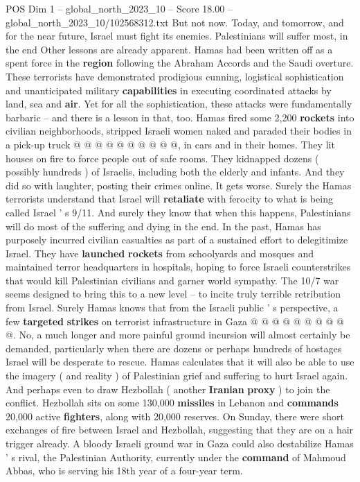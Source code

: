 \begin{textsample}{POS Dim 1 – global\_north\_2023\_10 – Score 18.00 – global\_north\_2023\_10/102568312.txt}
But not now.
Today, and tomorrow, and for the near future, Israel must fight its enemies.
Palestinians will suffer most, in the end Other lessons are already apparent.
Hamas had been written off as a spent force in the \textbf{region} following the Abraham Accords and the Saudi overture.
These terrorists have demonstrated prodigious cunning, logistical sophistication and unanticipated military \textbf{capabilities} in executing coordinated attacks by land, sea and \textbf{air}.
Yet for all the sophistication, these attacks were fundamentally barbaric -- and there is a lesson in that, too.
Hamas fired some 2,200 \textbf{rockets} into civilian neighborhoods, stripped Israeli women naked and paraded their bodies in a pick-up truck @ @ @ @ @ @ @ @ @ @, in cars and in their homes.
They lit houses on fire to force people out of safe rooms.
They kidnapped dozens ( possibly hundreds ) of Israelis, including both the elderly and infants.
And they did so with laughter, posting their crimes online.
It gets worse.
Surely the Hamas terrorists understand that Israel will \textbf{retaliate} with ferocity to what is being called Israel ' s 9/11.
And surely they know that when this happens, Palestinians will do most of the suffering and dying in the end.
In the past, Hamas has purposely incurred civilian casualties as part of a sustained effort to delegitimize Israel.
They have \textbf{launched} \textbf{rockets} from schoolyards and mosques and maintained terror headquarters in hospitals, hoping to force Israeli counterstrikes that would kill Palestinian civilians and garner world sympathy.
The 10/7 war seems designed to bring this to a new level -- to incite truly terrible retribution from Israel.
Surely Hamas knows that from the Israeli public ' s perspective, a few \textbf{targeted} \textbf{strikes} on terrorist infrastructure in Gaza @ @ @ @ @ @ @ @ @ @.
No, a much longer and more painful ground incursion will almost certainly be demanded, particularly when there are dozens or perhaps hundreds of hostages Israel will be desperate to rescue.
Hamas calculates that it will also be able to use the imagery ( and reality ) of Palestinian grief and suffering to hurt Israel again.
And perhaps even to draw Hezbollah ( another \textbf{Iranian} \textbf{proxy} ) to join the conflict.
Hezbollah sits on some 130,000 \textbf{missiles} in Lebanon and \textbf{commands} 20,000 active \textbf{fighters}, along with 20,000 reserves.
On Sunday, there were short exchanges of fire between Israel and Hezbollah, suggesting that they are on a hair trigger already.
A bloody Israeli ground war in Gaza could also destabilize Hamas ' s rival, the Palestinian Authority, currently under the \textbf{command} of Mahmoud Abbas, who is serving his 18th year of a four-year term.

\end{textsample}
